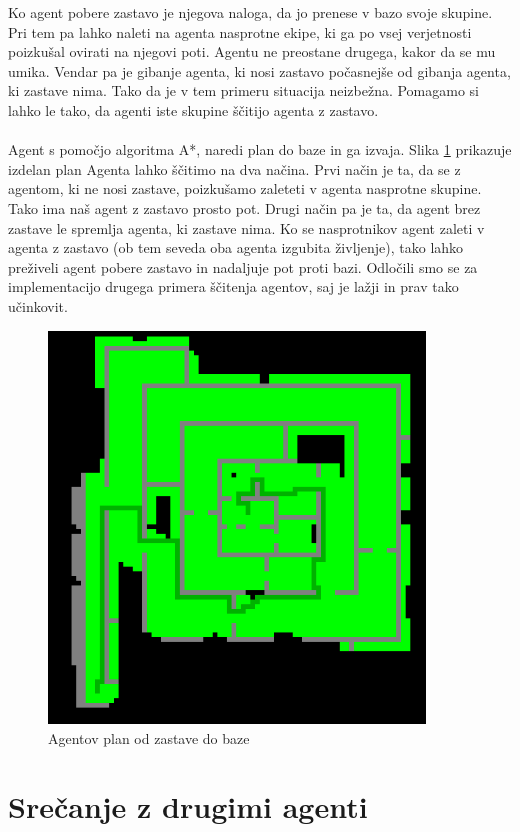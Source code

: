\documentclass[12pt,a4paper,openany]{book}
\begin{document}
Ko agent pobere zastavo je njegova naloga, da jo prenese v bazo svoje skupine. Pri tem pa lahko
 naleti na agenta nasprotne ekipe, ki ga po vsej verjetnosti poizkušal ovirati na njegovi poti.
 Agentu ne preostane drugega, kakor da se mu umika. Vendar pa je gibanje agenta, ki nosi zastavo
 počasnejše od gibanja agenta, ki zastave nima. Tako da je v tem primeru situacija neizbežna. 
Pomagamo si lahko le tako, da agenti iste skupine ščitijo agenta z zastavo.\\
\\
Agent s pomočjo algoritma A*, naredi plan do baze in ga izvaja. Slika \ref{} prikazuje izdelan 
plan Agenta lahko ščitimo na dva načina. Prvi način je ta, da se z agentom, ki ne nosi zastave, 
poizkušamo zaleteti v  agenta nasprotne skupine. Tako ima naš agent z zastavo prosto pot. 
Drugi način pa je ta, da agent brez zastave le spremlja agenta, ki zastave nima. Ko se 
nasprotnikov agent zaleti v agenta z zastavo (ob tem seveda oba agenta izgubita življenje), 
tako lahko preživeli agent pobere zastavo in nadaljuje pot proti bazi. Odločili smo se za 
implementacijo drugega primera ščitenja agentov, saj je lažji in prav tako učinkovit.\\
\begin{figure}[ht]
 \centering
 \includegraphics[width=10cm]{./pictures/plan.png}
 \caption[Izdelan plan]{Agentov plan od zastave do baze}
 \label{grupe}
\end{figure}


\section{Srečanje z drugimi agenti}
\end{document}
